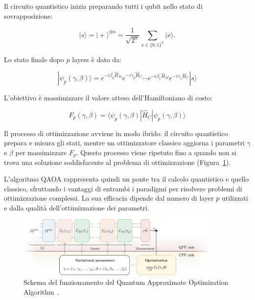Il circuito quantistico inizia preparando tutti i qubit nello stato di sovrapposizione:

\begin{equation}
   |s\rangle = |+\rangle^{\otimes n} = \frac{1}{\sqrt{2^n}}\sum_{x\in\{{0,1\}}^n} |x\rangle.
\end{equation}

Lo stato finale dopo $p$ layers è dato da:

\begin{equation}
   |\psi_p(\gamma, \beta)\rangle = e^{-i\beta_p \hat{H}_M} e^{-i\gamma_p \hat{H}_C} \cdots e^{-i\beta_1 \hat{H}_M} e^{-i\gamma_1 \hat{H}_C} |s\rangle
\end{equation}

L'obiettivo è massimizzare il valore atteso dell'Hamiltoniano di costo:

\begin{equation}
   F_p(\gamma, \beta) = \langle\psi_p(\gamma, \beta)| \hat{H}_C |\psi_p(\gamma, \beta)\rangle
\end{equation}

Il processo di ottimizzazione avviene in modo ibrido: il circuito quantistico prepara e 
misura gli stati, mentre un ottimizzatore classico aggiorna i parametri $\gamma$ e $\beta$ 
per massimizzare $F_p$. Questo processo viene ripetuto fino a quando non si trova una 
soluzione soddisfacente al problema di ottimizzazione (Figura~\ref{fig:circuitoQAOA}).

L'algoritmo QAOA rappresenta quindi un ponte tra il calcolo quantistico e quello classico, 
sfruttando i vantaggi di entrambi i paradigmi per risolvere problemi di ottimizzazione 
complessi. La sua efficacia dipende dal numero di layer $p$ utilizzati e dalla qualità 
dell'ottimizzazione dei parametri.


\begin{figure}[h!]
    \centering
    \includegraphics[width=0.9\textwidth]{images/qaoa.jpg}
    \caption{Schema del funzionamento del Quantum Approximate Optimization Algorithm~\cite{blekos2024review}.}
    \label{fig:circuitoQAOA}
\end{figure}